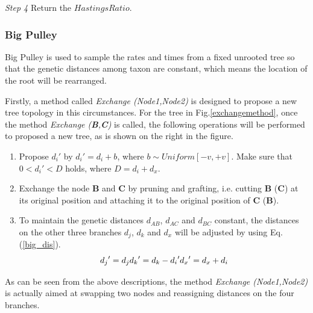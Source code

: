 \documentclass{bmcart}
\begin{document}
\emph{Step 4} Return the $HastingsRatio$.
\subsubsection*{Big Pulley}
Big Pulley is used to sample the rates and times from a fixed unrooted tree so that the genetic distances among taxon are constant, which means the location of the root will be rearranged.

Firstly, a method called \textit{Exchange (Node1,Node2)} is designed to propose a new tree topology in this circumstances. For the tree in Fig.\ref{exchangemethod}, once the method \textit{Exchange (\textbf{B},\textbf{C})} is called, the following operations will be performed to proposed a new tree, as is shown on the right in the figure.
\begin{enumerate} [(1)]
\item Propose ${d_i}'$ by ${d_i}' = {d_i} + b$, where $b \sim Uniform[ - v, + v]$. Make sure that $0 < {d_i}' < D$ holds, where $D = {d_i} + {d_x}$.
\item Exchange the node \textbf{B} and \textbf{C} by pruning and grafting, i.e. cutting \textbf{B} (\textbf{C}) at its original position and attaching it to the original position of \textbf{C} (\textbf{B}).
\item To maintain the genetic distances $d_{AB}$, $d_{AC}$ and $d_{BC}$ constant, the distances on the other three branches $d_j$, $d_k$ and $d_x$ will be adjusted by using Eq.(\ref{big_dis}).
\begin{equation}\label{big_dis}
{d_j}' = {d_j}\\
{d_k}' = {d_k} - {d_i}'\\
{d_x}' = {d_x} + {d_i}
\end{equation}
\end{enumerate}

As can be seen from the above descriptions, the method \textit{Exchange (Node1,Node2)} is actually aimed at swapping two nodes and reassigning distances on the four branches.
\end{document}
